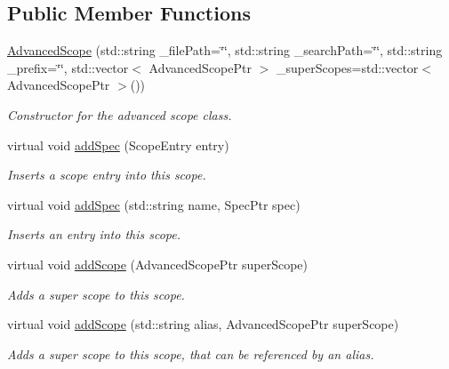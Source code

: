 \subsection*{Public Member Functions}
\begin{DoxyCompactItemize}
\item 
\hyperlink{classgiskard__suturo_1_1AdvancedScope_abd316ae06ac4991dbb381990546de4cd}{Advanced\-Scope} (std\-::string \-\_\-file\-Path=\char`\"{}\char`\"{}, std\-::string \-\_\-search\-Path=\char`\"{}\char`\"{}, std\-::string \-\_\-prefix=\char`\"{}\char`\"{}, std\-::vector$<$ Advanced\-Scope\-Ptr $>$ \-\_\-super\-Scopes=std\-::vector$<$ Advanced\-Scope\-Ptr $>$())
\begin{DoxyCompactList}\small\item\em Constructor for the advanced scope class. \end{DoxyCompactList}\item 
virtual void \hyperlink{classgiskard__suturo_1_1AdvancedScope_af2149977ef0016e5139f7b89f515de5b}{add\-Spec} (Scope\-Entry entry)
\begin{DoxyCompactList}\small\item\em Inserts a scope entry into this scope. \end{DoxyCompactList}\item 
virtual void \hyperlink{classgiskard__suturo_1_1AdvancedScope_ab3f65ac01f553fabc64c899dde9a4db9}{add\-Spec} (std\-::string name, Spec\-Ptr spec)
\begin{DoxyCompactList}\small\item\em Inserts an entry into this scope. \end{DoxyCompactList}\item 
virtual void \hyperlink{classgiskard__suturo_1_1AdvancedScope_a72372eceea6a63c12eb7cf278a7e55ec}{add\-Scope} (Advanced\-Scope\-Ptr super\-Scope)
\begin{DoxyCompactList}\small\item\em Adds a super scope to this scope. \end{DoxyCompactList}\item 
virtual void \hyperlink{classgiskard__suturo_1_1AdvancedScope_ad67b4f7fdf25994fccf3a553b741ecd4}{add\-Scope} (std\-::string alias, Advanced\-Scope\-Ptr super\-Scope)
\begin{DoxyCompactList}\small\item\em Adds a super scope to this scope, that can be referenced by an alias. \end{DoxyCompactList}\item 

\end{DoxyCompactItemize}
